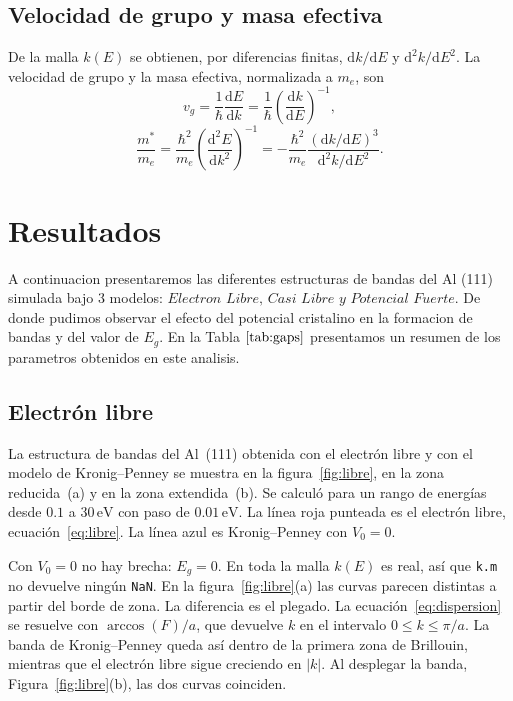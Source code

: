 \documentclass[reprint, amsmath, amssymb, aps, prb]{revtex4-2}
\begin{document}
\subsection{Velocidad de grupo y masa efectiva}

De la malla $k(E)$ se obtienen, por diferencias finitas, $\mathrm{d}k/\mathrm{d}E$ y $\mathrm{d}^2k/\mathrm{d}E^2$. La velocidad de grupo y la masa efectiva, normalizada a $m_e$, son
\begin{equation}
v_g=\frac{1}{\hbar}\frac{\mathrm{d}E}{\mathrm{d}k}
=\frac{1}{\hbar}\left(\frac{\mathrm{d}k}{\mathrm{d}E}\right)^{-1},
\label{eq:vg}
\end{equation}
\begin{equation}
\frac{m^*}{m_e}
=\frac{\hbar^2}{m_e}\left(\frac{\mathrm{d}^2E}{\mathrm{d}k^2}\right)^{-1}
=-\frac{\hbar^2}{m_e}\frac{(\mathrm{d}k/\mathrm{d}E)^3}{\mathrm{d}^2k/\mathrm{d}E^2}.
\label{eq:mstar}
\end{equation}










\section{Resultados}

A continuacion presentaremos las diferentes estructuras de bandas del Al (111) simulada bajo 3 modelos: $\textit{Electron Libre, Casi Libre y Potencial Fuerte}$.
De donde pudimos observar el efecto del potencial cristalino en la formacion de bandas y del valor de $E_g$. En la Tabla $\ref{tab:gaps}$ presentamos un resumen de los parametros obtenidos en este analisis.

\subsection{Electrón libre}

La estructura de bandas del Al~(111) obtenida con el electrón libre y con el modelo de Kronig--Penney se muestra en la figura~\ref{fig:libre}, en la zona reducida~(a) y en la zona extendida~(b). Se calculó para un rango de energías desde $0.1$ a $30\,\mathrm{eV}$ con paso de $0.01\,\mathrm{eV}$. La línea roja punteada es el electrón libre, ecuación~\eqref{eq:libre}. La línea azul es Kronig--Penney con $V_0=0$.

Con $V_0=0$ no hay brecha: $E_g=0$. En toda la malla $k(E)$ es real, así que \texttt{k.m} no devuelve ningún \texttt{NaN}. En la figura~\ref{fig:libre}(a) las curvas parecen distintas a partir del borde de zona. La diferencia es el plegado. La ecuación~\eqref{eq:dispersion} se resuelve con $\arccos(F)/a$, que devuelve $k$ en el intervalo $0\leq k\leq\pi/a$. La banda de Kronig--Penney queda así dentro de la primera zona de Brillouin, mientras que el electrón libre sigue creciendo en $|k|$. Al desplegar la banda, Figura~\ref{fig:libre}(b), las dos curvas coinciden.
\end{document}
